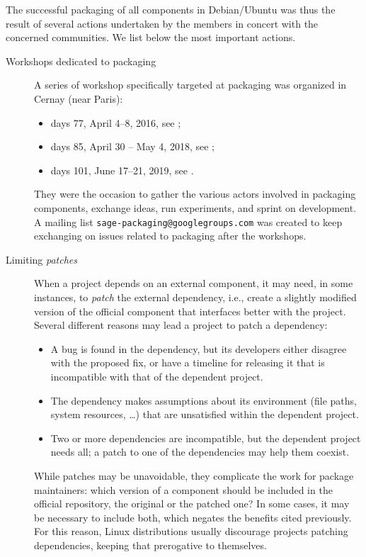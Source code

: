 \documentclass{deliverablereport}
\begin{document}
The successful packaging of all \ODK components in Debian/Ubuntu was
thus the result of several actions undertaken by the \ODK members in
concert with the concerned communities. %
We list below the most important actions.

\begin{description}
\item[Workshops dedicated to packaging] A series of workshop
  specifically targeted at packaging was organized in Cernay (near
  Paris):
  \begin{itemize}
  \item \Sage days 77, April 4--8, 2016, see ;
  \item \Sage days 85, April 30 -- May 4, 2018, see ;
  \item \Sage days 101, June 17--21, 2019, see .
  \end{itemize}
  They were the occasion to gather the various actors involved in
  packaging \ODK components, exchange ideas, run experiments, and
  sprint on development. %
  A mailing list \texttt{sage-packaging@googlegroups.com} was created
  to keep exchanging on issues related to packaging after the
  workshops.

\item[Limiting \emph{patches}] When a project depends on an external
  component, it may need, in some instances, to \emph{patch} the
  external dependency, i.e., create a slightly modified version of the
  official component that interfaces better with the project. %
  Several different reasons may lead a project to patch a dependency:
  \begin{itemize}
  \item A bug is found in the dependency, but its developers either
    disagree with the proposed fix, or have a timeline for releasing
    it that is incompatible with that of the dependent project.
  \item The dependency makes assumptions about its environment (file
    paths, system resources, \dots) that are unsatisfied within the
    dependent project.
  \item Two or more dependencies are incompatible, but the dependent
    project needs all; a patch to one of the dependencies may help
    them coexist.
  \end{itemize}

  While patches may be unavoidable, they complicate the work for
  package maintainers: which version of a component should be included
  in the official repository, the original or the patched one? %
  In some cases, it may be necessary to include both, which negates
  the benefits cited previously. %
  For this reason, Linux distributions usually discourage projects
  patching dependencies, keeping that prerogative to themselves. %


\end{description}
\end{document}
